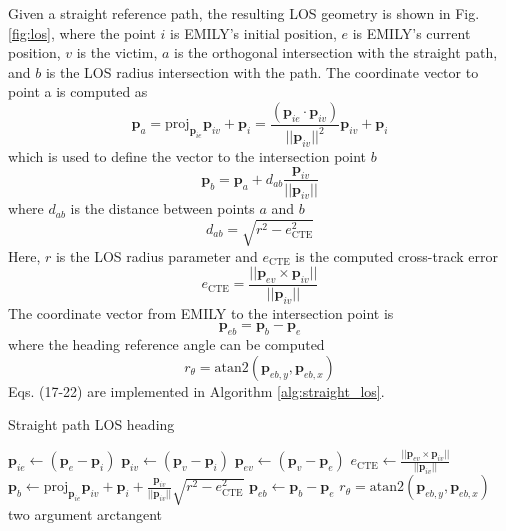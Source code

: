 \documentclass[conference]{IEEEtran}
\newcommand{\cte}{e_{\text{CTE}}}
\newcommand{\reference}{r_\theta}
\begin{document}
Given a straight reference path, the resulting LOS geometry is shown in Fig. \ref{fig:los}, where the point $i$ is EMILY's initial position, $e$ is EMILY's current position, $v$ is the victim, $a$ is the orthogonal intersection with the straight path, and $b$ is the LOS radius intersection with the path.
The coordinate vector to point a is computed as
\begin{equation}
  \bm{p}_a = \text{proj}_{\bm{p}_{ie}} \bm{p}_{iv} + \bm{p}_{i} = \frac{(\bm{p}_{ie} \cdot \bm{p}_{iv})}{||\bm{p}_{iv}||^2} \bm{p}_{iv} + \bm{p}_{i}
\end{equation}
which is used to define the vector to the intersection point $b$
\begin{equation}
  \bm{p}_{b} = \bm{p}_{a} + d_{ab} \frac{\bm{p}_{iv}}{||\bm{p}_{iv}||}
\end{equation}
where $d_{ab}$ is the distance between points $a$ and $b$
\begin{equation}
  d_{ab} = \sqrt{r^2 - \cte^2}
\end{equation}
Here, $r$ is the LOS radius parameter and $\cte$ is the computed cross-track error
\begin{equation}
  \cte = \frac{||\bm{p}_{ev} \times \bm{p}_{iv}||}{||\bm{p}_{iv}||}
\end{equation}
The coordinate vector from EMILY to the intersection point is
\begin{equation}
  \bm{p}_{eb} = \bm{p}_{b} - \bm{p}_{e}
\end{equation}
where the heading reference angle can be computed
\begin{equation}
  \reference = \text{atan2}(\bm{p}_{eb,y}, \bm{p}_{eb,x})
\end{equation}
Eqs. (17-22) are implemented in Algorithm \ref{alg:straight_los}.

\begin{algorithm}[h]
\caption{Straight path LOS heading}\label{alg:straight_los}
\begin{algorithmic}[1]
\State $\bm{p}_{ie} \gets (\bm{p}_{e} - \bm{p}_{i})$
\State $\bm{p}_{iv} \gets (\bm{p}_{v} - \bm{p}_{i})$
\State $\bm{p}_{ev} \gets (\bm{p}_{v} - \bm{p}_{e})$
\State $  \cte \gets \frac{||\bm{p}_{ev} \times \bm{p}_{iv}||}{||\bm{p}_{iv}||}$
\State $\bm{p}_{b} \gets \text{proj}_{\bm{p}_{ie}} \bm{p}_{iv} + \bm{p}_{i} + \frac{\bm{p}_{iv}}{||\bm{p}_{iv}||} \sqrt{r^2 - \cte^2}$
\State $\bm{p}_{eb} \gets \bm{p}_{b} - \bm{p}_{e}$
\State $\reference = \text{atan2}(\bm{p}_{eb,y}, \bm{p}_{eb,x})$ \Comment two argument arctangent
\State \Return{$\reference, \cte$}
\EndFunction
\end{algorithmic}
\end{algorithm}
\end{document}
